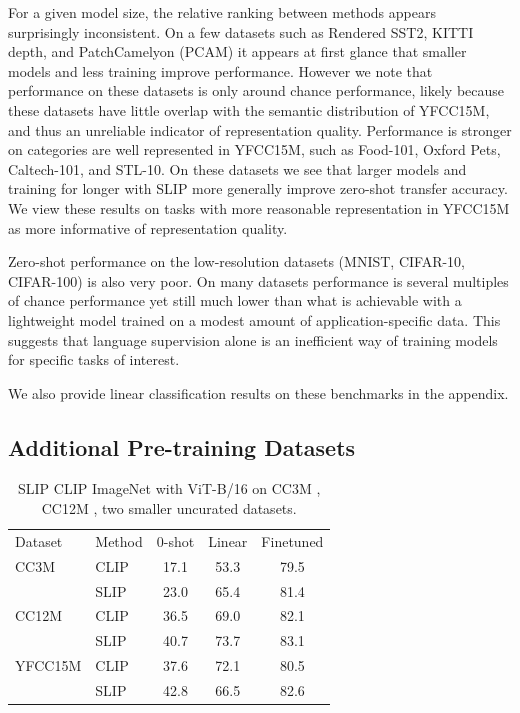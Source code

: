 \documentclass[10pt,twocolumn,letterpaper]{article}
\newcommand{\tablestyle}[2]{\setlength{\tabcolsep}{#1}\renewcommand{\arraystretch}{#2}\centering\footnotesize}
\begin{document}
For a given model size, the relative ranking between methods appears surprisingly inconsistent.
On a few datasets such as Rendered SST2, KITTI depth, and PatchCamelyon (PCAM) it appears at first glance that smaller models and less training improve performance.
However we note that performance on these datasets is only around chance performance, likely because these datasets have little overlap with the semantic distribution of YFCC15M, and thus an unreliable indicator of representation quality.
Performance is stronger on categories are well represented in YFCC15M, such as Food-101, Oxford Pets, Caltech-101, and STL-10.
On these datasets we see that larger models and training for longer with SLIP more generally improve zero-shot transfer accuracy.
We view these results on tasks with more reasonable representation in YFCC15M as more informative of representation quality.

Zero-shot performance on the low-resolution datasets (MNIST, CIFAR-10, CIFAR-100) is also very poor.
On many datasets performance is several multiples of chance performance yet still much lower than what is achievable with a lightweight model trained on a modest amount of application-specific data.
This suggests that language supervision alone is an inefficient way of training models for specific tasks of interest.

We also provide linear classification results on these benchmarks in the appendix.
 
\subsection{Additional Pre-training Datasets}

\begin{table}[h]
\tablestyle{2pt}{1.1}
\begin{tabular}{l l c c c}
Dataset & Method & 0-shot & Linear & Finetuned \\
\shline
CC3M & CLIP & 17.1 & 53.3 & 79.5 \\
& SLIP & 23.0 & 65.4 & 81.4 \\
\hline
CC12M & CLIP & 36.5 & 69.0 & 82.1 \\
  & SLIP & 40.7 & 73.7 & 83.1 \\
\hline
YFCC15M & CLIP & 37.6 & 72.1 & 80.5 \\
& SLIP & 42.8 & 66.5 & 82.6 \\
\end{tabular}
\vspace{-.5em}
\caption{SLIP \vs CLIP ImageNet with ViT-B/16 on CC3M \cite{Sharma2018ConceptualCA}, CC12M \cite{Changpinyo2021Conceptual1P}, two smaller uncurated datasets.
}
\label{tab:datasets}
\vspace{-0.5em}
\end{table}
\end{document}
